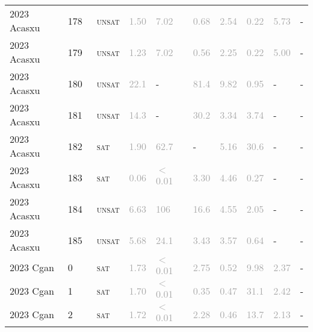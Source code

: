 \begin{center}
{\begin{longtable}{@{}llllllllll@{}}
2023 Acasxu & 178 & ~\textsc{unsat} & \textcolor{darkgray}{1.50} & \textcolor{darkgray}{7.02} & \textcolor{darkgray}{0.68} & \textcolor{darkgray}{2.54} & \textcolor{darkgray}{0.22} & \textcolor{darkgray}{5.73} & - \\
2023 Acasxu & 179 & ~\textsc{unsat} & \textcolor{darkgray}{1.23} & \textcolor{darkgray}{7.02} & \textcolor{darkgray}{0.56} & \textcolor{darkgray}{2.25} & \textcolor{darkgray}{0.22} & \textcolor{darkgray}{5.00} & - \\
2023 Acasxu & 180 & ~\textsc{unsat} & \textcolor{darkgray}{22.1} & - & \textcolor{darkgray}{81.4} & \textcolor{darkgray}{9.82} & \textcolor{darkgray}{0.95} & - & - \\
2023 Acasxu & 181 & ~\textsc{unsat} & \textcolor{darkgray}{14.3} & - & \textcolor{darkgray}{30.2} & \textcolor{darkgray}{3.34} & \textcolor{darkgray}{3.74} & - & - \\
2023 Acasxu & 182 & ~\textsc{sat} & \textcolor{darkgray}{1.90} & \textcolor{darkgray}{62.7} & - & \textcolor{darkgray}{5.16} & \textcolor{darkgray}{30.6} & - & - \\
2023 Acasxu & 183 & ~\textsc{sat} & \textcolor{darkgray}{0.06} & \textcolor{darkgray}{$<$0.01} & \textcolor{darkgray}{3.30} & \textcolor{darkgray}{4.46} & \textcolor{darkgray}{0.27} & - & - \\
2023 Acasxu & 184 & ~\textsc{unsat} & \textcolor{darkgray}{6.63} & \textcolor{darkgray}{106} & \textcolor{darkgray}{16.6} & \textcolor{darkgray}{4.55} & \textcolor{darkgray}{2.05} & - & - \\
2023 Acasxu & 185 & ~\textsc{unsat} & \textcolor{darkgray}{5.68} & \textcolor{darkgray}{24.1} & \textcolor{darkgray}{3.43} & \textcolor{darkgray}{3.57} & \textcolor{darkgray}{0.64} & - & - \\
\midrule
2023 Cgan & 0 & ~\textsc{sat} & \textcolor{darkgray}{1.73} & \textcolor{darkgray}{$<$0.01} & \textcolor{darkgray}{2.75} & \textcolor{darkgray}{0.52} & \textcolor{darkgray}{9.98} & \textcolor{darkgray}{2.37} & - \\
2023 Cgan & 1 & ~\textsc{sat} & \textcolor{darkgray}{1.70} & \textcolor{darkgray}{$<$0.01} & \textcolor{darkgray}{0.35} & \textcolor{darkgray}{0.47} & \textcolor{darkgray}{31.1} & \textcolor{darkgray}{2.42} & - \\
2023 Cgan & 2 & ~\textsc{sat} & \textcolor{darkgray}{1.72} & \textcolor{darkgray}{$<$0.01} & \textcolor{darkgray}{2.28} & \textcolor{darkgray}{0.46} & \textcolor{darkgray}{13.7} & \textcolor{darkgray}{2.13} & - \\

\end{longtable}}
\end{center}
